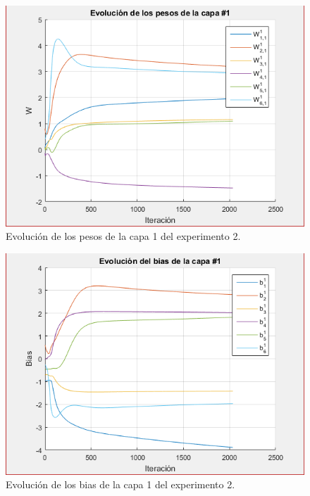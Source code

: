 \documentclass[12pt, titlepage]{article}
\begin{document}
\begin{figure}[H]
    \begin{center}
        \includegraphics[width=12cm]{2/pesos1.png}
        \caption{Evolución de los pesos de la capa 1 del experimento 2.}
        \label{fig:pesos3}
    \end{center}
\end{figure}

\begin{figure}[H]
    \begin{center}
        \includegraphics[width=12cm]{2/bias1.png}
        \caption{Evolución de los bias de la capa 1 del experimento 2.}
        \label{fig:bias3}
    \end{center}
\end{figure}
\end{document}
